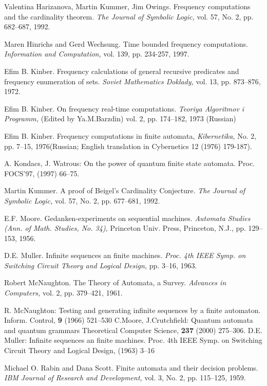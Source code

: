 \documentclass{llncs}
\begin{document}
\begin{thebibliography}{99}
Valentina Harizanova, Martin Kummer, Jim Owings.
Frequency computations and the cardinality theorem.
{\em The Journal of Symbolic Logic,} vol. 57, No. 2, pp. 682--687, 1992.

Maren Hinrichs and Gerd Wechsung.
Time bounded frequency computations.
{\em Information and Computation,} vol. 139, pp. 234-257, 1997.



Efim B. Kinber.
Frequency calculations of general recursive predicates and frequency
enumeration of sets.
{\em Soviet Mathematics Doklady,} vol. 13, pp. 873--876, 1972.

Efim B. Kinber.
On frequency real-time computations.
{\em Teoriya Algoritmov i Programm,} (Edited by Ya.M.Barzdin) vol. 2, pp. 174--182, 1973 (Russian) 


Efim B. Kinber.
Frequency computations in finite automata,
{\em Kibernetika,} No. 2, pp. 7--15, 1976(Russian; English translation in Cybernetics 12 (1976) 179-187). 

A. Kondacs, J. Watrous:
On the power of quantum finite state automata. 
Proc. FOCS'97, (1997) 66--75.
%


Martin Kummer.
A proof of Beigel's Cardinality Conjecture. 
{\em The Journal of Symbolic Logic,} vol. 57, No. 2, pp. 677--681, 1992.

E.F. Moore.
Gedanken-experiments on sequential machines.
{\em Automata Studies (Ann. of Math. Studies, No. 34),} Princeton Univ. Press, Princeton, N.J., pp. 129--153, 1956.

D.E. Muller. 
Infinite sequences an finite machines.
{\em Proc. 4th IEEE Symp. on Switching Circuit Theory and Logical Design,} pp. 3--16, 1963.

Robert McNaughton.
The Theory of Automata, a Survey.
{\em Advances in Computers,} vol. 2, pp. 379--421, 1961.

R. McNaughton: 
Testing and generating infinite sequences by a finite automaton.
Inform. Control, {\bf 9} (1966) 521--530
%
C.Moore, J.Crutchfield:
Quantum automata and quantum grammars
Theoretical Computer Science, {\bf 237} (2000) 275--306.
%
D.E. Muller: 
Infinite sequences an finite machines.
Proc. 4th IEEE Symp. on Switching Circuit Theory and Logical Design, (1963) 3--16
%


Michael O. Rabin and Dana Scott.
Finite automata and their decision problems.
{\em IBM Journal of Research and Development,} vol. 3, No. 2, pp. 115--125, 1959.


\end{thebibliography}
\end{document}
